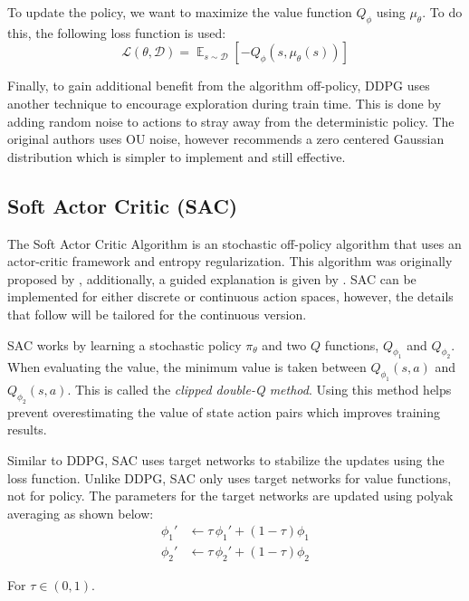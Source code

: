 \documentclass[conference]{IEEEtran}
\begin{document}
To update the policy, we want to maximize the value function $Q_\phi$ using $\mu_\theta$. To do this, the following loss function is used:
$$
    \mathcal{L}(\theta, \mathcal{D}) = \mathop{\mathbb{E}}_{s \sim \mathcal{D}}\left[-Q_\phi(s, \mu_\theta(s))\right]
$$

Finally, to gain additional benefit from the algorithm off-policy, DDPG uses another technique to encourage exploration during train time. This is done by adding random noise to actions to stray away from the deterministic policy. The original authors uses OU noise, however \cite{spinning_up_ddpg} recommends a zero centered Gaussian distribution which is simpler to implement and still effective.

\subsection{Soft Actor Critic (SAC)}

The Soft Actor Critic Algorithm is an stochastic off-policy algorithm that uses an actor-critic framework and entropy regularization. This algorithm was originally proposed by \cite{SAC1, SAC2}, additionally, a guided explanation is given by \cite{spinning_up_sac}. SAC can be implemented for either discrete or continuous action spaces, however, the details that follow will be tailored for the continuous version.

SAC works by learning a stochastic policy $\pi_\theta$ and two $Q$ functions, $Q_{\phi_1}$ and $Q_{\phi_2}$.  When evaluating the value, the minimum value is taken between $Q_{\phi_1}(s, a)$ and $Q_{\phi_2}(s, a)$. This is called the \textit{clipped double-Q method}. Using this method helps prevent overestimating the value of state action pairs which improves training results.

Similar to DDPG, SAC uses target networks to stabilize the updates using the loss function. Unlike DDPG, SAC only uses target networks for value functions, not for policy. The parameters for the target networks are updated using polyak averaging as shown below:
\begin{align*}
    \phi_1' & \leftarrow \tau \, \phi_1' + (1 - \tau) \phi_1 \\
    \phi_2' & \leftarrow \tau \, \phi_2' + (1 - \tau) \phi_2
\end{align*}

\begin{flushleft}
    For $\tau \in (0, 1)$.
\end{flushleft}
\end{document}
